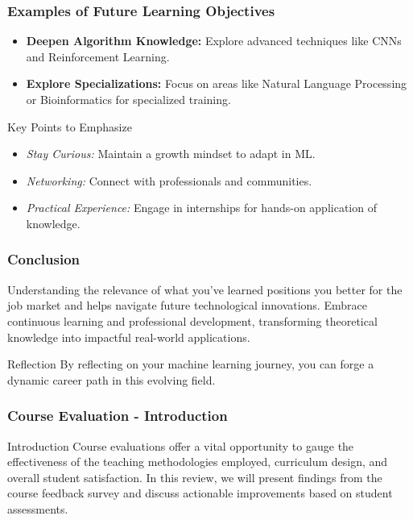 \documentclass[aspectratio=169]{beamer}
\begin{document}
\begin{frame}[fragile]
    \frametitle{Examples of Future Learning Objectives}

    \begin{itemize}
        \item \textbf{Deepen Algorithm Knowledge:} Explore advanced techniques like CNNs and Reinforcement Learning.
        
        \item \textbf{Explore Specializations:} Focus on areas like Natural Language Processing or Bioinformatics for specialized training.
    \end{itemize}
    
    \begin{block}{Key Points to Emphasize}
        \begin{itemize}
            \item \textit{Stay Curious:} Maintain a growth mindset to adapt in ML.
            \item \textit{Networking:} Connect with professionals and communities.
            \item \textit{Practical Experience:} Engage in internships for hands-on application of knowledge.
        \end{itemize}
    \end{block}
\end{frame}

\begin{frame}[fragile]
    \frametitle{Conclusion}

    Understanding the relevance of what you've learned positions you better for the job market and helps navigate future technological innovations. Embrace continuous learning and professional development, transforming theoretical knowledge into impactful real-world applications.

    \begin{block}{Reflection}
        By reflecting on your machine learning journey, you can forge a dynamic career path in this evolving field.
    \end{block}
\end{frame}

\begin{frame}[fragile]
    \frametitle{Course Evaluation - Introduction}
    \begin{block}{Introduction}
        Course evaluations offer a vital opportunity to gauge the effectiveness of the teaching methodologies employed, curriculum design, and overall student satisfaction. 
        In this review, we will present findings from the course feedback survey and discuss actionable improvements based on student assessments.
    \end{block}
\end{frame}
\end{document}
